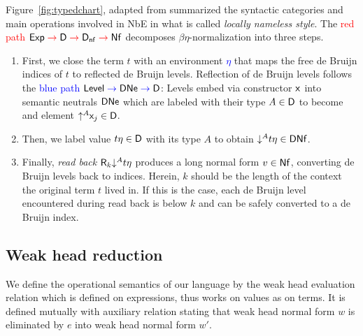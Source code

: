 \documentclass[acmlarge,review,anonymous]{acmart}\settopmatter{printfolios=true}
\begin{document}
\newcommand{\redto}{\mathrel{\color{red}{\to}}}
\newcommand{\blueto}{\mathrel{\color{blue}{\to}}}

Figure~\ref{fig:typedchart}, adapted from \citet{abel:habil} summarized the syntactic categories and main operations involved in NbE in what is called \emph{locally nameless style}.  The \textcolor{red}{red path} $\Exp \redto \D \redto \Dnf \redto \Nf$ decomposes $\beta\eta$-normalization into three steps.
\begin{enumerate}
\item
First, we close the term $t$ with an environment \textcolor{blue}{$\eta$} that maps the
free de Bruijn indices of $t$ to reflected de Bruijn levels.
Reflection of de Bruijn levels follows the \textcolor{blue}{blue path}
$\Level \blueto \DNe \blueto \D$: Levels embed via constructor $\mathsf{x}_{}$
into semantic neutrals $\mathsf{DNe}$ which are labeled with their type $A \in \mathsf{D}$ to become and element $\mathord{\uparrow^{A}} \mathsf{x}_{j} \in \mathsf{D}$.

\item
Then, we label value $t \eta \in \mathsf{D}$ with its type $A$ to obtain $\mathord{\downarrow^{A}} t \eta \in \mathsf{DNf}$.
\item
Finally, \emph{read back} %
$\mathsf{R}_k \mathord{\downarrow^{A}} t\eta$ produces a long normal form $v \in \mathsf{Nf}$, converting de Bruijn levels back to indices.
Herein, $k$ should be the length of the context the original term $t$ lived in.
If this is the case, each de Bruijn level encountered during read back is below $k$ and can be safely converted to a de Bruijn index.
\end{enumerate}

\subsection{Weak head reduction}

We define the operational semantics of our language by the weak head
evaluation relation  which is defined on
expressions, thus works on values as on terms.  It is defined mutually
with auxiliary relation  stating that weak
head normal form $w$ is eliminated by $e$ into weak head normal form $w'$.
\end{document}
